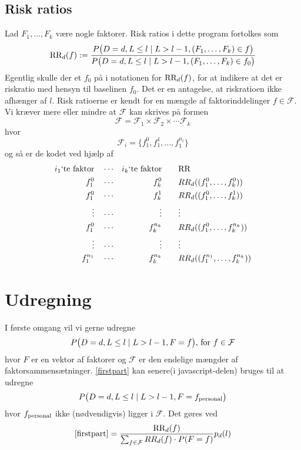 \documentclass[a4paper, 12pt]{memoir}
\begin{document}
\subsection{Risk ratios}
Lad $F_1, \dots, F_k$ være nogle faktorer. Risk ratios i dette program fortolkes som
\begin{align*}
\textup{RR}_{d}(f):=\frac{P\bigl(D=d, L \leq l \mid L>l-1, (F_1, \dots, F_k)\in f \bigr)}{P\bigl(D=d, L \leq l \mid L>l-1, (F_1, \dots, F_k)\in f_0\bigr)}
\end{align*}
Egentlig skulle der et $f_0$ på i notationen for $\textup{RR}_{d}(f)$, for at indikere at det er riskratio med hensyn til baselinen $f_0$. Det er en antagelse, at riskratioen ikke afhænger af $l$. Risk ratioerne er kendt for en mængde af faktorinddelinger $f\in \mathcal F$. Vi kræver mere eller mindre at $\mathcal F$ kan skrives på formen
\begin{equation*}
\mathcal F=\mathcal F_1 \times \mathcal F_2 \times \cdots \mathcal F_k
\end{equation*}
hvor 
\begin{equation*}
\mathcal F_i = \{f_1^0, f_1^1, \dots, f_1^{n_i}\}
\end{equation*}
og så er de kodet ved hjælp af 
\begin{align*}
 i_1 \textup{`te faktor} \quad& \cdots&  i_k\textup{`te faktor} \qquad& 	\textup{RR}\\
f_1^0 \quad & \cdots& f_k^0 \qquad&  RR_d((f_1^0, \dots, f_k^0))\\
f_1^0 \quad & \cdots& f_k^1 \qquad&  RR_d((f_1^0, \dots, f_k^1))\\
\vdots\quad &\cdots &\vdots \qquad &\vdots\\
f_1^0 \quad & \cdots& f_k^{n_k} \qquad&  RR_d((f_1^0, \dots, f_k^{n_k}))\\
\vdots\quad &\cdots &\vdots \qquad &\vdots\\
f_1^{n_1} \quad & \cdots& f_k^{n_k} \qquad& RR_d((f_1^{n_1}, \dots, f_k^{n_k}))
\end{align*}

\section{Udregning}
I første omgang vil vi gerne udregne
\begin{align}
P\bigl(D=d, L\leq l \mid L>l-1, F=f\bigr), \, \textup{for } f\in \mathcal F \label{firstpart}
\end{align}
hvor $F$ er en vektor af faktorer og $\mathcal F$ er den endelige mængder af faktorsammensætninger. \eqref{firstpart} kan senere(i javascript-delen) bruges til at udregne
\begin{equation}
P\bigl(D=d, L\leq l \mid L>l-1, F=f_{\textup{personal}}\bigr)\label{lastpart}
\end{equation}
hvor $f_{\textup{personal}}$ ikke (nødvendigvis) ligger i $\mathcal F$.
Det gøres ved
\begin{align}
\eqref{firstpart}=\frac{\textup{RR}_{d}(f)}{\sum_{f\in \mathcal F} RR_d(f)\cdot P(F=f)}p_d(l) \label{rr_calc}
\end{align}
\end{document}
